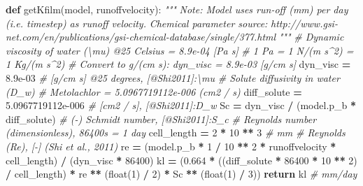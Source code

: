 \documentclass[]{article}
\newenvironment{Shaded}{\begin{snugshade}}{\end{snugshade}}
\newcommand{\KeywordTok}[1]{\textcolor[rgb]{0.13,0.29,0.53}{\textbf{#1}}}
\newcommand{\DecValTok}[1]{\textcolor[rgb]{0.00,0.00,0.81}{#1}}
\newcommand{\FloatTok}[1]{\textcolor[rgb]{0.00,0.00,0.81}{#1}}
\newcommand{\CommentTok}[1]{\textcolor[rgb]{0.56,0.35,0.01}{\textit{#1}}}
\newcommand{\ControlFlowTok}[1]{\textcolor[rgb]{0.13,0.29,0.53}{\textbf{#1}}}
\newcommand{\OperatorTok}[1]{\textcolor[rgb]{0.81,0.36,0.00}{\textbf{#1}}}
\newcommand{\BuiltInTok}[1]{#1}
\newcommand{\NormalTok}[1]{#1}
\begin{document}
\begin{Shaded}
\begin{Highlighting}[]
\KeywordTok{def}\NormalTok{ getKfilm(model, runoffvelocity):}
    \CommentTok{"""}
\CommentTok{    Note: Model uses run-off (mm) per day (i.e. timestep) as runoff velocity.}
\CommentTok{    Chemical parameter source:}
\CommentTok{    http://www.gsi-net.com/en/publications/gsi-chemical-database/single/377.html}
\CommentTok{    """}
    \CommentTok{# Dynamic viscosity of water (\textbackslash{}mu) @25 Celsius = 8.9e-04 [Pa s]}
    \CommentTok{#   1 Pa = 1 N/(m s^2) = 1 Kg/(m s^2)}
    \CommentTok{#   Convert to g/(cm s): dyn_visc = 8.9e-03 [g/cm s]}
\NormalTok{    dyn_visc }\OperatorTok{=} \FloatTok{8.9e-03}  \CommentTok{# [g/cm s] @25 degrees, [@Shi2011]:\textbackslash{}mu}
    \CommentTok{# Solute diffusivity in water (D_w)}
    \CommentTok{# Metolachlor = 5.0967719112e-006 (cm2 / s)}
\NormalTok{    diff_solute }\OperatorTok{=} \FloatTok{5.0967719112e-006}  \CommentTok{# [cm2 / s], [@Shi2011]:D_w}
\NormalTok{    Sc }\OperatorTok{=}\NormalTok{ dyn_visc }\OperatorTok{/}\NormalTok{ (model.p_b }\OperatorTok{*}\NormalTok{ diff_solute)  }\CommentTok{# (-) Schmidt number, [@Shi2011]:S_c}
    \CommentTok{# Reynolds number (dimensionless), 86400s = 1 day}
\NormalTok{    cell_length }\OperatorTok{=} \DecValTok{2} \OperatorTok{*} \DecValTok{10} \OperatorTok{**} \DecValTok{3}  \CommentTok{# mm}
    \CommentTok{# Reynolds (Re), [-] (Shi et al., 2011)}
\NormalTok{    re }\OperatorTok{=}\NormalTok{ (model.p_b }\OperatorTok{*} \DecValTok{1} \OperatorTok{/} \DecValTok{10} \OperatorTok{**} \DecValTok{2} \OperatorTok{*}\NormalTok{ runoffvelocity }\OperatorTok{*}\NormalTok{ cell_length) }\OperatorTok{/}\NormalTok{ (dyn_visc }\OperatorTok{*} \DecValTok{86400}\NormalTok{)}
\NormalTok{    kl }\OperatorTok{=}\NormalTok{ (}\FloatTok{0.664} \OperatorTok{*}\NormalTok{ ((diff_solute }\OperatorTok{*} \DecValTok{86400} \OperatorTok{*} \DecValTok{10} \OperatorTok{**} \DecValTok{2}\NormalTok{) }\OperatorTok{/}\NormalTok{ cell_length) }\OperatorTok{*}
\NormalTok{          re }\OperatorTok{**}\NormalTok{ (}\BuiltInTok{float}\NormalTok{(}\DecValTok{1}\NormalTok{) }\OperatorTok{/} \DecValTok{2}\NormalTok{) }\OperatorTok{*}\NormalTok{ Sc }\OperatorTok{**}\NormalTok{ (}\BuiltInTok{float}\NormalTok{(}\DecValTok{1}\NormalTok{) }\OperatorTok{/} \DecValTok{3}\NormalTok{)) }
    \ControlFlowTok{return}\NormalTok{ kl  }\CommentTok{# mm/day}
\end{Highlighting}
\end{Shaded}
\end{document}
